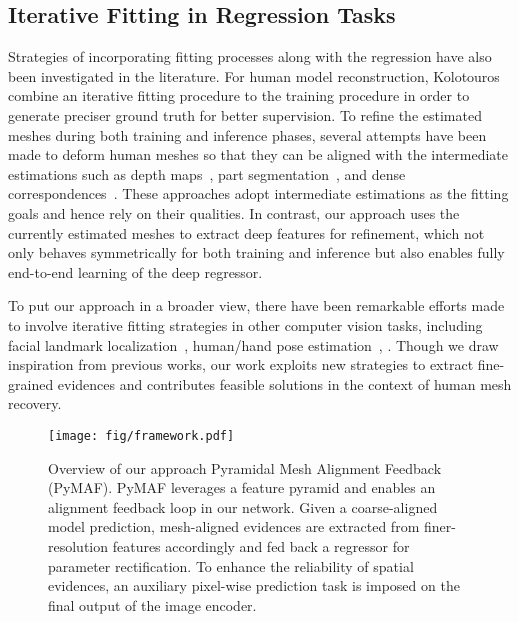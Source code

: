 \documentclass[10pt,twocolumn,letterpaper]{article}
\begin{document}
\subsection{Iterative Fitting in Regression Tasks}
Strategies of incorporating fitting processes along with the regression have also been investigated in the literature.
For human model reconstruction, Kolotouros \etal~\cite{kolotouros2019learning} combine an iterative fitting procedure to the training procedure in order to generate preciser ground truth for better supervision.
To refine the estimated meshes during both training and inference phases, several attempts have been made to deform human meshes so that they can be aligned with the intermediate estimations such as depth maps~\cite{zhu2019detailed}, part segmentation~\cite{zanfir2020neural}, and dense correspondences~\cite{guler2019holopose}.
These approaches adopt intermediate estimations as the fitting goals and hence rely on their qualities.
In contrast, our approach uses the currently estimated meshes to extract deep features for refinement, which not only behaves symmetrically for both training and inference but also enables fully end-to-end learning of the deep regressor.

To put our approach in a broader view, there have been remarkable efforts made to involve iterative fitting strategies in other computer vision tasks, including facial landmark localization~\cite{xiong2013supervised,trigeorgis2016mnemonic}, human/hand pose estimation~\cite{oberweger2015training,carreira2016human}, \etc.
Though we draw inspiration from previous works, our work exploits new strategies to extract fine-grained evidences and contributes feasible solutions in the context of human mesh recovery.

 
\begin{figure*}[t]
	\begin{center}
		\texttt{[image: fig/framework.pdf]}
		\caption{Overview of our approach Pyramidal Mesh Alignment Feedback (PyMAF). PyMAF leverages a feature pyramid and enables an alignment feedback loop in our network. Given a coarse-aligned model prediction, mesh-aligned evidences are extracted from finer-resolution features accordingly and fed back a regressor for parameter rectification. To enhance the reliability of spatial evidences, an auxiliary pixel-wise prediction task is imposed on the final output of the image encoder.}
		\vspace{-5mm}
		\label{fig:framework}
	\end{center}
\end{figure*}
\end{document}
